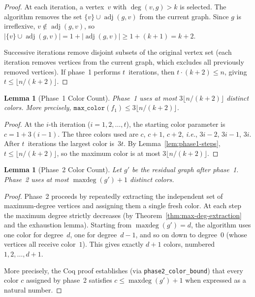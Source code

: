 \documentclass[11pt]{article}
\theoremstyle{plain}
\newtheorem{lemma}[theorem]{Lemma}
\theoremstyle{definition}
\theoremstyle{remark}
\newcommand{\adj}{\operatorname{adj}}
\newcommand{\degree}{\operatorname{deg}}
\newcommand{\maxdeg}{\operatorname{maxdeg}}
\newcommand{\ie}{\textit{i.e.}}
\begin{document}
\begin{proof}
At each iteration, a vertex~$v$ with $\degree(v,g) > k$ is selected.
The algorithm removes the set $\{v\} \cup \adj(g,v)$ from the current graph.
Since $g$ is irreflexive, $v \notin \adj(g,v)$, so
$|\{v\} \cup \adj(g,v)| = 1 + |\adj(g,v)| \ge 1 + (k{+}1) = k{+}2$.

Successive iterations remove disjoint subsets of the original vertex set
(each iteration removes vertices from the current graph,
which excludes all previously removed vertices).
If phase~1 performs $t$~iterations, then $t \cdot (k{+}2) \le n$,
giving $t \le \lfloor n/(k{+}2)\rfloor$.
\end{proof}

\begin{lemma}[Phase~1 Color Count]
\label{lem:phase1-colors}
Phase~1 uses at most $3\lfloor n/(k{+}2)\rfloor$ distinct colors.
More precisely, $\texttt{max\_color}(f_1) \le 3\lfloor n/(k{+}2)\rfloor$.
\end{lemma}

\begin{proof}
At the $i$-th iteration ($i = 1, 2, \ldots, t$), the starting color parameter is
$c = 1 + 3(i{-}1)$.
The three colors used are $c$, $c{+}1$, $c{+}2$, \ie, $3i{-}2$, $3i{-}1$, $3i$.
After $t$~iterations the largest color is~$3t$.
By Lemma~\ref{lem:phase1-steps}, $t \le \lfloor n/(k{+}2)\rfloor$,
so the maximum color is at most $3\lfloor n/(k{+}2)\rfloor$.
\end{proof}

\begin{lemma}[Phase~2 Color Count]
\label{lem:phase2-colors}
Let $g'$ be the residual graph after phase~1.
Phase~2 uses at most $\maxdeg(g') + 1$ distinct colors.
\end{lemma}

\begin{proof}
Phase~2 proceeds by repeatedly extracting the independent set of
maximum-degree vertices and assigning them a single fresh color.
At each step the maximum degree strictly decreases
(by Theorem~\ref{thm:max-deg-extraction} and the exhaustion lemma).
Starting from $\maxdeg(g') = d$, the algorithm uses one color for
degree~$d$, one for degree~$d{-}1$, and so on down to degree~$0$
(whose vertices all receive color~$1$).
This gives exactly $d + 1$ colors, numbered $1, 2, \ldots, d{+}1$.

More precisely, the Coq proof establishes
(via \texttt{phase2\_color\_bound})
that every color $c$ assigned by phase~2 satisfies
$c \le \maxdeg(g') + 1$ when expressed as a natural number.
\end{proof}
\end{document}
